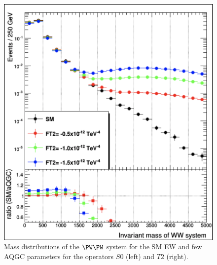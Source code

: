 \begin{figure}[htb]
\includegraphics[width=\cmsFigWidth]{Plots/aQGC_Signal_Scaling/mWW_FT2.png}
\caption{Mass distributions of the $\PW \PW$ system for the SM EW and few AQGC parameters for the operators $S0$ (left) and $T2$ (right).}
\label{fig:aqgc_signal}
\end{figure}


